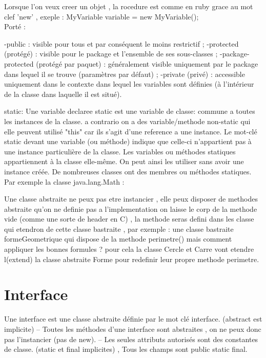 \documentclass[a4paper,12pt,openany]{book}
\begin{document}
Lorsque l'on veux creer un objet , la rocedure est comme en ruby grace au mot clef 'new' , exeple : 
MyVariable variable = new MyVariable();
\\
Porté :

-public : visible pour tous et par conséquent le moins restrictif ;
-protected (protégé) : visible pour le package et l'ensemble de ses sous-classes ;
-package-protected (protégé par paquet) : généralement visible uniquement par le package dans lequel il se trouve (paramètres par défaut) ;
-private (privé) : accessible uniquement dans le contexte dans lequel les variables sont définies (à l'intérieur de la classe dans laquelle il est situé).

static: Une variable declaree static est une variable de classe: commune a toutes les instances de la classe. a contrario on a des variable/methode non-static qui elle peuvent utilisé "this" car ils s'agit d'une reference a une instance.
Le mot-clé static devant une variable (ou méthode) indique que celle-ci n'appartient pas à une instance particulière de la classe. Les variables ou méthodes statiques appartiennent à la classe elle-même. On peut ainsi les utiliser sans avoir une instance créée. De nombreuses classes ont des membres ou méthodes statiques. Par exemple la classe java.lang.Math :



Une classe abstraite ne peux pas etre instancier , elle peux disposer de methodes abstraite qu'on ne definie pas a l'implementation on laisse le corp de la methode vide (comme une sorte de header en C) , la methode seras defini dans les classe qui etendron de cette classe bastraite , par exemple : 
 une classe bastraite formeGeometrique qui dispose de la methode perimetre() mais comment appliquer les bonnes formules ? pour cela la classe Cercle et Carre vont etendre l(extend) la classe abstraite Forme pour redefinir leur propre methode perimetre.

\section{Interface}

Une interface est une classe abstraite définie par le mot clé interface. (abstract est implicite)
– Toutes les méthodes d’une interface sont abstraites , on ne peux donc pas l'instancier (pas de new).
– Les seules attributs autorisés sont des constantes de classe. (static et final implicites) , Tous les champs sont public static final.
\end{document}
